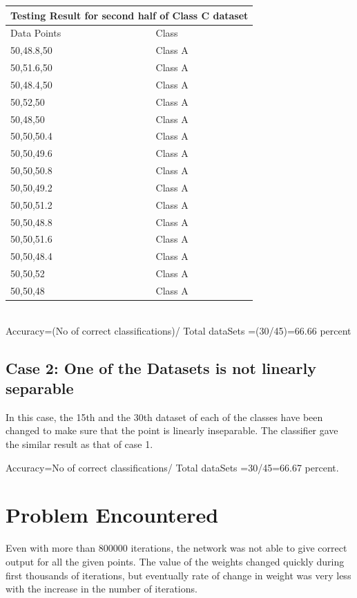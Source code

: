 \documentclass[letterpaper]{article}
\begin{document}
\begin{tabular}{ |p{5cm}||p{5cm}| }
 \hline
 \multicolumn{2}{|c|}{Testing Result for second half of Class C dataset} \\
 \hline
Data Points& Class\\
 \hline
50,48.8,50 & Class A \\
50,51.6,50 & Class A \\
50,48.4,50 & Class A \\
50,52,50 & Class A \\
50,48,50 & Class A \\
50,50,50.4 & Class A \\
50,50,49.6 & Class A \\
50,50,50.8 & Class A \\
50,50,49.2 & Class A \\
50,50,51.2 & Class A \\
50,50,48.8 & Class A \\
50,50,51.6 & Class A \\
50,50,48.4 & Class A \\
50,50,52 & Class A \\
50,50,48 & Class A \\
 \hline

\end {tabular} \\

Accuracy=(No of correct classifications)/ Total dataSets =(30/45)=66.66 percent 


\subsection {Case 2: One of the Datasets is not linearly separable}
In this case, the 15th and the 30th dataset of each of the classes have been changed to make sure that the point is linearly inseparable. The classifier gave the similar result as that of case 1. 

Accuracy=No of correct classifications/ Total dataSets =30/45=66.67 percent. 

\section {Problem Encountered}
Even with more than 800000 iterations, the network was not able to give correct output for all the given points. The value of the weights changed quickly during first thousands of iterations, but eventually rate of change in weight was very less with the increase in the number of iterations. 
\end{document}
